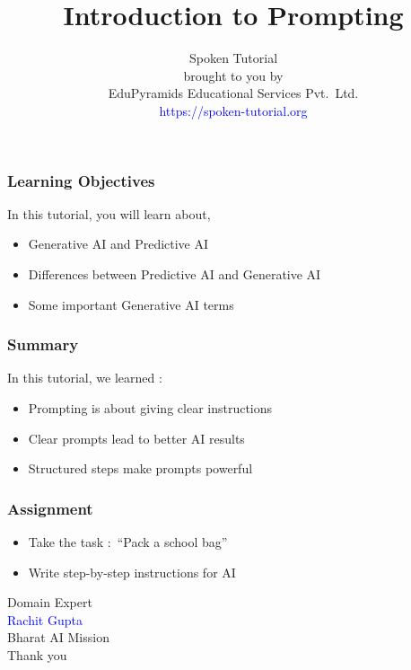\documentclass[17pt,xcolor=table]{beamer}
\title  [Introduction to Prompting\hspace{0.5cm}]
{Introduction to Prompting}\date{}
\author [\ EduPyramids Educational Services Pvt.\ Ltd.]{%
{Spoken Tutorial}\\[5pt]
  { \small brought to you by }\\[5pt]
{EduPyramids Educational Services Pvt.\ Ltd.}\\[10pt]
  { \textcolor{blue}{https://spoken-tutorial.org}}
}
\date{} %
\begin{document}
\sffamily\bfseries

\begin{frame}
  \titlepage
\end{frame}


\begin{frame}
\frametitle{Learning Objectives}
In this tutorial, you will learn about,\\
\begin{itemize}
\item Generative AI and Predictive AI
\item Differences between Predictive AI and Generative AI
\item Some important Generative AI terms
\end{itemize}
\end{frame}


\begin{frame}
\frametitle{Summary}
In this tutorial, we learned : 
\begin{itemize}
\item Prompting is about giving clear instructions
\item Clear prompts lead to better AI results
\item Structured steps make prompts powerful
\end{itemize}
\end{frame}

\begin{frame}
\frametitle{Assignment}
\begin{itemize}
\item Take the task :\ “Pack a school bag” 
\item Write step-by-step instructions for AI
\end{itemize}
\end{frame}


\begin{frame}
  \centering   \vspace{12pt} 
{ \small  Domain Expert}\\[12pt]
{\textcolor{blue}{Rachit Gupta}}\\
 { Bharat AI Mission}\\  [1.5cm]
 \large Thank you
\end{frame}
\end{document}
